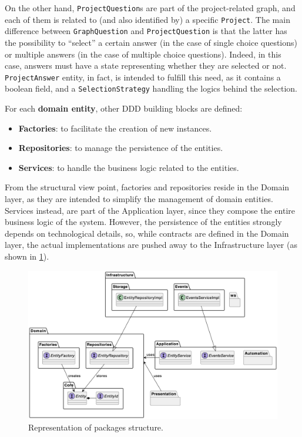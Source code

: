 \documentclass[12pt,a4paper,openright,twoside]{book}
\begin{document}
On the other hand, \texttt{ProjectQuestion}s are part of the project-related graph, and each of them is related to (and also identified by) a specific \texttt{Project}.
%
The main difference between \texttt{GraphQuestion} and \texttt{ProjectQuestion} is that the latter has the possibility to ``select'' a certain answer (in the case of single choice questions) or multiple answers (in the case of multiple choice questions).
%
Indeed, in this case, answers must have a state representing whether they are selected or not.
%
\texttt{ProjectAnswer} entity, in fact, is intended to fulfill this need, as it contains a boolean field, and a \texttt{SelectionStrategy} handling the logics behind the selection.

\vspace{1cm}
\noindent
For each \textbf{domain entity}, other \ac{DDD} building blocks are defined:

\begin{itemize}
    \item \textbf{Factories}: to facilitate the creation of new instances.
    \item \textbf{Repositories}: to manage the persistence of the entities.
    \item \textbf{Services}: to handle the business logic related to the entities.
\end{itemize}

From the structural view point, factories and repositories reside in the Domain layer, as they are intended to simplify the management of domain entities.
%
Services instead, are part of the Application layer, since they compose the entire business logic of the system.
%
However, the persistence of the entities strongly depends on technological details, so, while contracts are defined in the Domain layer, the actual implementations are pushed away to the Infrastructure layer (as shown in \cref{fig:packages}).

\begin{figure}
    \centering
    \includegraphics[width=\linewidth]{figures/diagrams/packages.png}
    \caption{
        Representation of packages structure.
    }
    \label{fig:packages}
\end{figure}
\end{document}
